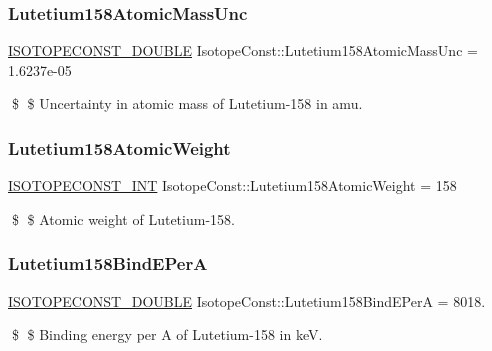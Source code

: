 \subsubsection{\texorpdfstring{Lutetium158\+Atomic\+Mass\+Unc}{Lutetium158AtomicMassUnc}}
{\footnotesize\ttfamily \mbox{\hyperlink{group___isotope_const-_macros_ga8f45a7272ce02c0b4c65c44636ed719a}{I\+S\+O\+T\+O\+P\+E\+C\+O\+N\+S\+T\+\_\+\+D\+O\+U\+B\+LE}} Isotope\+Const\+::\+Lutetium158\+Atomic\+Mass\+Unc = 1.\+6237e-\/05}

\$ \$ Uncertainty in atomic mass of Lutetium-\/158 in amu. \mbox{\label{group___isotope_const-_lutetium-_lu158_ga535325db920756d0d090fb67c3884d7b}} 
\subsubsection{\texorpdfstring{Lutetium158\+Atomic\+Weight}{Lutetium158AtomicWeight}}
{\footnotesize\ttfamily \mbox{\hyperlink{group___isotope_const-_macros_ga5f18360b3e99483a35c32d789e62621c}{I\+S\+O\+T\+O\+P\+E\+C\+O\+N\+S\+T\+\_\+\+I\+NT}} Isotope\+Const\+::\+Lutetium158\+Atomic\+Weight = 158}

\$ \$ Atomic weight of Lutetium-\/158. \mbox{\label{group___isotope_const-_lutetium-_lu158_ga61527feaf0a3e6c555e59ff007a34682}} 
\subsubsection{\texorpdfstring{Lutetium158\+Bind\+E\+PerA}{Lutetium158BindEPerA}}
{\footnotesize\ttfamily \mbox{\hyperlink{group___isotope_const-_macros_ga8f45a7272ce02c0b4c65c44636ed719a}{I\+S\+O\+T\+O\+P\+E\+C\+O\+N\+S\+T\+\_\+\+D\+O\+U\+B\+LE}} Isotope\+Const\+::\+Lutetium158\+Bind\+E\+PerA = 8018.}

\$ \$ Binding energy per A of Lutetium-\/158 in keV. \mbox{\label{group___isotope_const-_lutetium-_lu158_ga8570affe619ff306591e6aec0798625d}} 
